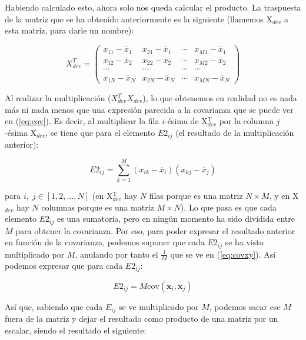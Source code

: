 \documentclass[11pt,a4paper]{article}
\newcommand{\cov}{\text{cov}}
\begin{document}
Habiendo calculado esto, ahora solo nos queda calcular el producto. La traspuesta de la matriz que se ha obtenido
anteriormente es la siguiente (llamemos X$_{dev}$ a esta matriz, para darle un nombre):

\begin{equation}
\label{eq:x1t}
X_{dev}^T = 
\left(
{
\begin{array}{cccc}
	x_{11} - \overline{x}_{1} & x_{21} - \overline{x}_{1} & \cdots & x_{M1} - \overline{x}_{1} \\
	x_{12} - \overline{x}_{2} & x_{22} - \overline{x}_{2} & \cdots & x_{M2} - \overline{x}_{2} \\
	\cdots & \cdots & \cdots & \cdots \\
	x_{1N} - \overline{x}_{N} & x_{2N} - \overline{x}_{N} & \cdots & x_{MN} - \overline{x}_{N}
\end{array}
}
\right)
\end{equation}

Al realizar la multiplicación ($X_{dev}^TX_{dev}$), lo que obtenemos en realidad no es nada más ni nada menos que una
expresión parecida a la covarianza que se puede ver en (\ref{eq:cov}). Es decir, al multiplicar la fila $i$-ésima de 
X$_{dev}^\text{T}$ por la columna $j$-ésima X$_{dev}$, se tiene que para el elemento $E2_{ij}$ (el resultado de la
multiplicación anterior):

\begin{equation}
	E2_{ij} = \sum_{k=1}^M (x_{ik} - \overline{x}_i)(x_{kj} - \overline{x}_j)
\end{equation}

\noindent para $i, \; j \in [1, 2, \dots, N]$ (en X$_{dev}^\text{T}$ hay $N$ filas porque es una matriz $N \times M$, y en
X$_{dev}$ hay $N$ columnas porque es una matriz $M \times N$). Lo que pasa es que cada elemento $E2_{ij}$ es una sumatoria,
pero en ningún momento ha sido dividida entre $M$ para obtener la covarianza. Por eso, para poder expresar el resultado
anterior en función de la covarianza, podemos suponer que cada $E2_{ij}$ se ha visto multiplicado por $M$, anulando por tanto
el $\frac{1}{M}$ que se ve en (\ref{eq:covxy}). Así podemos expresar que para cada $E2_{ij}$:

\begin{equation}
	E2_{ij} = M \cov(\mathbf{x}_i,\mathbf{x}_j)
\end{equation}

Así que, sabiendo que cada $E_{ij}$ se ve multiplicado por $M$, podemos sacar ese $M$ fuera de la matriz y dejar el resultado
como producto de una matriz por un escalar, siendo el resultado el siguiente:
\end{document}
